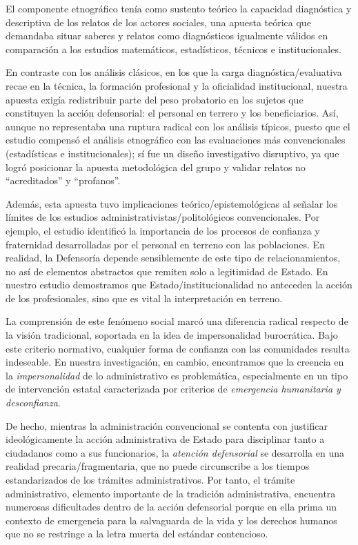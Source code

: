 \documentclass[
  spanish,
  11pt,
  a4paper,
]{scrbook}
\begin{document}
El componente etnográfico tenía como sustento teórico la capacidad
diagnóstica y descriptiva de los relatos de los actores sociales, una
apuesta teórica que demandaba situar saberes y relatos como diagnósticos
igualmente válidos en comparación a los estudios matemáticos,
estadísticos, técnicos e institucionales.

En contraste con los análisis clásicos, en los que la carga
diagnóstica/evaluativa recae en la técnica, la formación profesional y
la oficialidad institucional, nuestra apuesta exigía redistribuir parte
del peso probatorio en los sujetos que constituyen la acción
defensorial: el personal en terrero y los beneficiarios. Así, aunque no
representaba una ruptura radical con los análisis típicos, puesto que el
estudio compensó el análisis etnográfico con las evaluaciones más
convencionales (estadísticas e institucionales); sí fue un diseño
investigativo disruptivo, ya que logró posicionar la apuesta
metodológica del grupo y validar relatos no ``acreditados'' y
``profanos''.

Además, esta apuesta tuvo implicaciones teórico/epistemológicas al
señalar los límites de los estudios administrativistas/politológicos
convencionales. Por ejemplo, el estudio identificó la importancia de los
procesos de confianza y fraternidad desarrolladas por el personal en
terreno con las poblaciones. En realidad, la Defensoría depende
sensiblemente de este tipo de relacionamientos, no así de elementos
abstractos que remiten solo a legitimidad de Estado. En nuestro estudio
demostramos que Estado/institucionalidad no anteceden la acción de los
profesionales, sino que es vital la interpretación en terreno.

La comprensión de este fenómeno social marcó una diferencia radical
respecto de la visión tradicional, soportada en la idea de
impersonalidad burocrática. Bajo este criterio normativo, cualquier
forma de confianza con las comunidades resulta indeseable. En nuestra
investigación, en cambio, encontramos que la creencia en la
\emph{impersonalidad} de lo administrativo es problemática,
especialmente en un tipo de intervención estatal caracterizada por
criterios de \emph{emergencia humanitaria y desconfianza}.

De hecho, mientras la administración convencional se contenta con
justificar ideológicamente la acción administrativa de Estado para
disciplinar tanto a ciudadanos como a sus funcionarios, la
\emph{atención defensorial} se desarrolla en una realidad
precaria/fragmentaria, que no puede circunscribe a los tiempos
estandarizados de los trámites administrativos. Por tanto, el trámite
administrativo, elemento importante de la tradición administrativa,
encuentra numerosas dificultades dentro de la acción defensorial porque
en ella prima un contexto de emergencia para la salvaguarda de la vida y
los derechos humanos que no se restringe a la letra muerta del estándar
contencioso.
\end{document}
